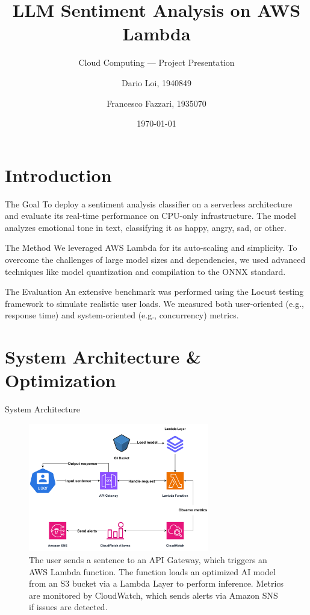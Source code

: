 \documentclass{beamer}
\title{LLM Sentiment Analysis on AWS Lambda} %
\subtitle{Cloud Computing --- Project Presentation} %
\author{Dario Loi, 1940849 \and Francesco Fazzari, 1935070} %
\institute{Sapienza, University of Rome} %
\date{\today}
\begin{document}
\begin{frame}
\titlepage%
\end{frame}


\section{Introduction}
\begin{frame}{The Goal}
    To deploy a sentiment analysis classifier on a serverless architecture and evaluate its real-time performance on CPU-only infrastructure. The model analyzes emotional tone in text, classifying it as happy, angry, sad, or other.
\end{frame}

\begin{frame}{The Method}
    We leveraged AWS Lambda for its auto-scaling and simplicity. To overcome the challenges of large model sizes and dependencies, we used advanced techniques like model quantization and compilation to the ONNX standard.
\end{frame}

\begin{frame}{The Evaluation}
    An extensive benchmark was performed using the Locust testing framework to simulate realistic user loads. We measured both user-oriented (e.g., response time) and system-oriented (e.g., concurrency) metrics.
\end{frame}

\section{System Architecture \& Optimization}
\begin{frame}{System Architecture}
    \begin{figure}[H]
        \centering
        \includegraphics[width=0.7\textwidth]{emo-diag.pdf}
        \caption{The user sends a sentence to an API Gateway, which triggers an AWS Lambda function. The function loads an optimized AI model from an S3 bucket via a Lambda Layer to perform inference. Metrics are monitored by CloudWatch, which sends alerts via Amazon SNS if issues are detected.}
    \end{figure}
\end{frame}
\end{document}
